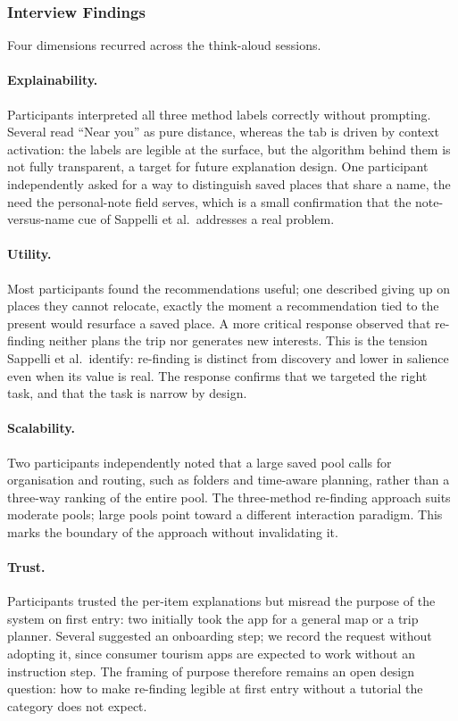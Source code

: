 \documentclass[acmlarge]{acmart}
\begin{document}
\subsubsection{Interview Findings}
Four dimensions recurred across the think-aloud sessions.

\paragraph{Explainability.}
Participants interpreted all three method labels correctly without
prompting. Several read ``Near you'' as pure distance, whereas the tab is
driven by context activation: the labels are legible at the surface, but
the algorithm behind them is not fully transparent, a target for future
explanation design. One participant independently asked for a way to
distinguish saved places that share a name, the need the personal-note
field serves, which is a small confirmation that the note-versus-name cue
of Sappelli et al.\ addresses a real problem.

\paragraph{Utility.}
Most participants found the recommendations useful; one described giving
up on places they cannot relocate, exactly the moment a recommendation
tied to the present would resurface a saved place. A more critical
response observed that re-finding neither plans the trip nor generates new
interests. This is the tension Sappelli et al.\ identify: re-finding is
distinct from discovery and lower in salience even when its value is real.
The response confirms that we targeted the right task, and that the task
is narrow by design.

\paragraph{Scalability.}
Two participants independently noted that a large saved pool calls for
organisation and routing, such as folders and time-aware planning, rather
than a three-way ranking of the entire pool. The three-method re-finding
approach suits moderate pools; large pools point toward a different
interaction paradigm. This marks the boundary of the approach without
invalidating it.

\paragraph{Trust.}
Participants trusted the per-item explanations but misread the purpose of
the system on first entry: two initially took the app for a general map or
a trip planner. Several suggested an onboarding step; we record the
request without adopting it, since consumer tourism apps are expected to
work without an instruction step. The framing of purpose therefore remains
an open design question: how to make re-finding legible at first entry
without a tutorial the category does not expect.
\end{document}
